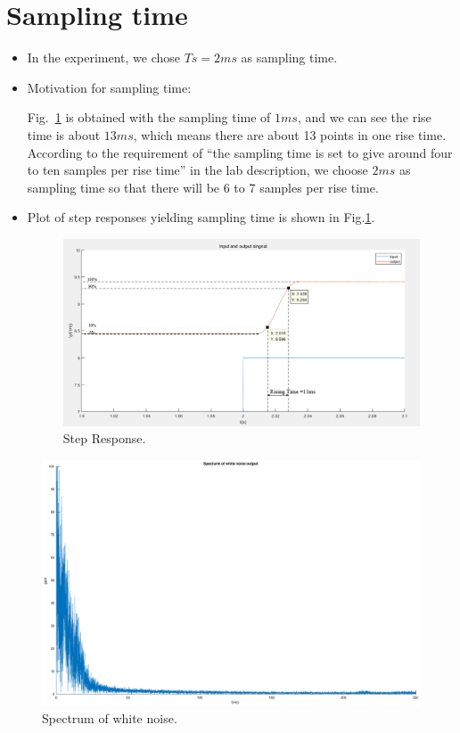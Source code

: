\documentclass[10pt,a4paper]{article}
\begin{document}
\section{Sampling time}
\begin{itemize}
    \item In the experiment, we chose $Ts = 2ms$ as sampling time.
    \item Motivation for sampling time:
    \par Fig.~\ref{fig:samplingTime} is obtained with the sampling time of $1ms$, and we can see the rise time is about $13ms$, which means there are about 13 points in one rise time. According to the requirement of ``the sampling time is set to give around four to ten samples per rise time'' in the lab description, we choose $2ms$ as sampling time so that there will be 6 to 7 samples per rise time.
    \item Plot of step responses yielding sampling time is shown in Fig.\ref{fig:samplingTime}.
    \begin{figure}[h]
		\footnotesize
		\centering 
		\includegraphics[width=0.7\columnwidth]{findSamplingTime.png} 
		\caption{Step Response.}
		\label{fig:samplingTime}
	\end{figure}
\end{itemize}
\begin{figure}[h]
		\footnotesize
		\centering
		\includegraphics[width=0.7\columnwidth]{whiteNoiseSpectrum.eps} 
		\caption{Spectrum of white noise.}
		\label{fig:whiteNoiseSpectrum}
	\end{figure}
\end{document}
